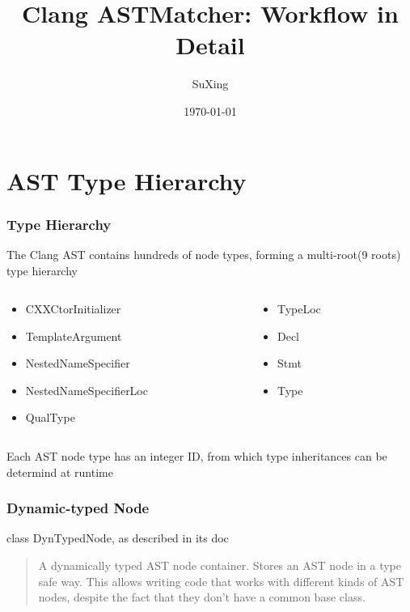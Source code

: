 \documentclass[]{beamer}
\title{Clang ASTMatcher: Workflow in Detail}
\author[SuXing~pysuxing@gmail.com]{SuXing}
\institute{TOW}
\date{\today}
\begin{document}
\setlength{\parindent}{0pt}

\frame{\titlepage}

\frame{\tableofcontents}

\section{AST Type Hierarchy}
\frame{\tableofcontents[currentsection]}

\begin{frame}
  \frametitle{Type Hierarchy}
  The Clang AST contains hundreds of node types, forming a
  multi-root(9 roots) type hierarchy
  \pause
  \begin{columns}
    \begin{column}{.5\textwidth}
      \begin{itemize}
        \item CXXCtorInitializer
        \item TemplateArgument
        \item NestedNameSpecifier
        \item NestedNameSpecifierLoc
        \item QualType
      \end{itemize}
    \end{column}
    \begin{column}{.5\textwidth}
      \begin{itemize}
        \item TypeLoc
        \item \alert{Decl}
        \item \alert{Stmt}
        \item \alert{Type}
      \end{itemize}
    \end{column}
  \end{columns}
  \pause
  Each AST node type has an integer ID, from which type inheritances can
  be determind at runtime
\end{frame}

\begin{frame}
  \frametitle{Dynamic-typed Node}
  class \alert{DynTypedNode}, as described in its doc
  \begin{quotation}
    A dynamically typed AST node container.
    Stores an AST node in a type safe way.
    This allows writing code that works with different
    kinds of AST nodes, despite the fact that they don't
    have a common base class.
  \end{quotation}
  \pause
  
\end{frame}
\end{document}
